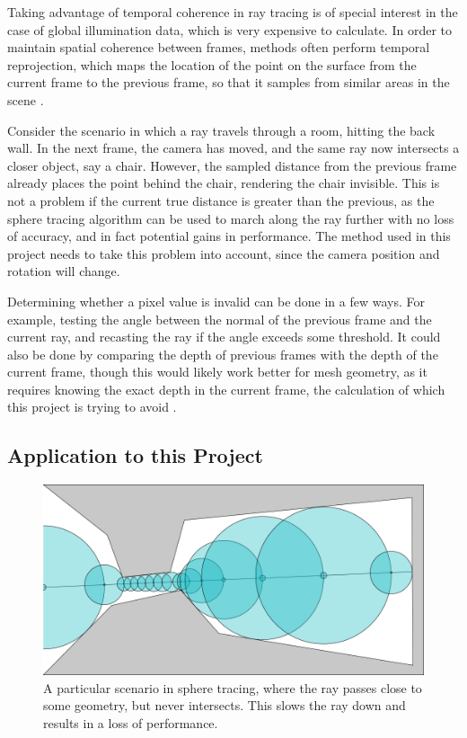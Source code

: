 Taking advantage of temporal coherence in ray tracing is of special interest in the case of global illumination data, which is very expensive to calculate. In order to maintain spatial coherence between frames, methods often perform temporal reprojection, which maps the location of the point on the surface from the current frame to the previous frame, so that it samples from similar areas in the scene \cite{scherzer2012temporal}.\newline

Consider the scenario in which a ray travels through a room, hitting the back wall. In the next frame, the camera has moved, and the same ray now intersects a closer object, say a chair. However, the sampled distance from the previous frame already places the point behind the chair, rendering the chair invisible. This is not a problem if the current true distance is greater than the previous, as the sphere tracing algorithm can be used to march along the ray further with no loss of accuracy, and in fact potential gains in performance. The method used in this project needs to take this problem into account, since the camera position and rotation will change.\newline

Determining whether a pixel value is invalid can be done in a few ways. For example, testing the angle between the normal of the previous frame and the current ray, and recasting the ray if the angle exceeds some threshold. It could also be done by comparing the depth of previous frames with the depth of the current frame, though this would likely work better for mesh geometry, as it requires knowing the exact depth in the current frame, the calculation of which this project is trying to avoid \cite{weier2016foveated}.

\subsection{Application to this Project}

\begin{figure} [ht]
	\centering
	\includegraphics[width=0.75\linewidth, frame]{Images/Sphere-Tracing-Bottleneck.png}
	\caption{A particular scenario in sphere tracing, where the ray passes close to some geometry, but never intersects. This slows the ray down and results in a loss of performance.}
	\label{figure:sphere-tracing-bottleneck}
\end{figure}

